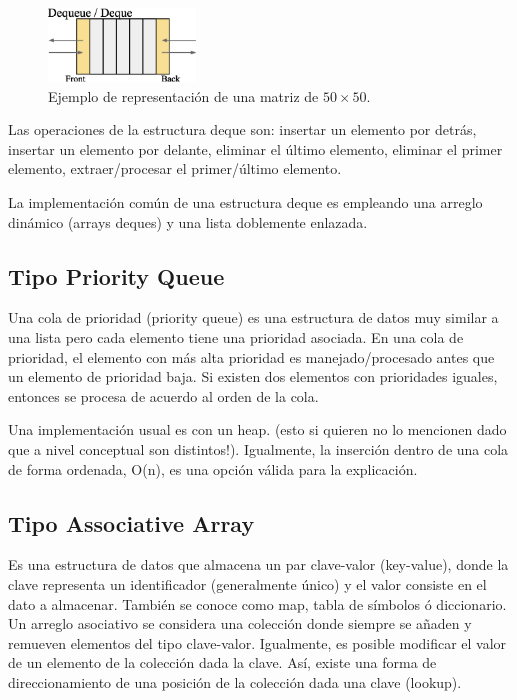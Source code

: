 \begin{figure}[htp!]
  \begin{center}
    \includegraphics[width=0.35\textwidth]{images/deque.eps}
  \end{center}
  \caption{Ejemplo de representación de una matriz de $50 \times 50$.}
  \label{fig:deque}
\end{figure}

Las operaciones de la estructura deque son: insertar un elemento por detrás, insertar un elemento por delante, eliminar el último elemento, eliminar el primer elemento, extraer/procesar el primer/último elemento.

La implementación común de una estructura deque es empleando una arreglo dinámico (arrays deques) y una lista doblemente enlazada.

\subsection{Tipo Priority Queue}

Una cola de prioridad (priority queue) es una estructura de datos muy similar a una lista pero cada elemento tiene una prioridad asociada. En una cola de prioridad, el elemento con más alta prioridad es manejado/procesado antes que un elemento de prioridad baja. Si existen dos elementos con prioridades iguales, entonces se procesa de acuerdo al orden de la cola.

Una implementación usual es con un heap. (esto si quieren no lo mencionen dado que a nivel conceptual son distintos!). Igualmente, la inserción dentro de una cola de forma ordenada, O(n), es una opción válida para la explicación.

\subsection{Tipo Associative Array}

Es una estructura de datos que almacena un par clave-valor (key-value), donde la clave representa un identificador (generalmente único) y el valor consiste en el dato a almacenar. También se conoce como map, tabla de símbolos ó diccionario. Un arreglo asociativo se considera una colección donde siempre se añaden y remueven elementos del tipo clave-valor. Igualmente, es posible modificar el valor de un elemento de la colección dada la clave. Así, existe una forma de direccionamiento de una posición de la colección dada una clave (lookup).

